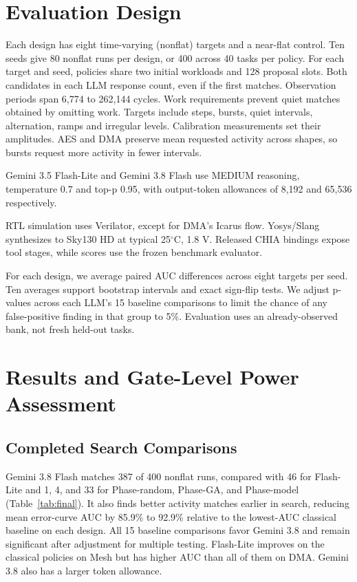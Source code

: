 \documentclass[conference]{IEEEtran}
\begin{document}
\section{Evaluation Design}
Each design has eight time-varying (nonflat) targets and a near-flat control.
Ten seeds give 80 nonflat runs per design, or 400 across 40 tasks per policy.
For each target and seed, policies share two initial workloads and 128 proposal
slots. Both candidates in each LLM response count, even if the first matches.
Observation periods span 6,774 to 262,144 cycles. Work requirements prevent
quiet matches obtained by omitting work.
Targets include steps, bursts, quiet intervals, alternation, ramps and irregular
levels. Calibration measurements set their amplitudes. AES and DMA preserve
mean requested activity across shapes, so bursts request more activity in fewer
intervals.

Gemini 3.5 Flash-Lite and Gemini 3.8 Flash use MEDIUM reasoning, temperature
0.7 and top-p 0.95, with output-token allowances of 8,192 and 65,536 respectively.

RTL simulation uses Verilator, except for DMA's Icarus flow. Yosys/Slang
synthesizes to Sky130 HD at typical 25$^\circ$C, 1.8 V. Released CHIA bindings
expose tool stages, while scores use the frozen benchmark evaluator.

For each design, we average paired AUC differences across eight targets per
seed. Ten averages support bootstrap intervals and exact sign-flip tests.
We adjust p-values across each LLM's 15 baseline comparisons to limit
the chance of any false-positive finding in that group to 5\%.
Evaluation uses an already-observed bank, not fresh held-out tasks.


\section{Results and Gate-Level Power Assessment}
\label{sec:results}
\subsection{Completed Search Comparisons}
Gemini 3.8 Flash matches 387 of 400 nonflat runs, compared with 46 for
Flash-Lite and 1, 4, and 33 for Phase-random, Phase-GA, and Phase-model
(Table~\ref{tab:final}). It also finds better activity matches earlier in
search, reducing mean error-curve AUC by 85.9\% to 92.9\% relative to the
lowest-AUC classical baseline on each design. All 15 baseline comparisons
favor Gemini 3.8 and remain significant after adjustment for multiple testing.
Flash-Lite improves on the classical policies on Mesh but has higher AUC than
all of them on DMA. Gemini 3.8 also has a larger token allowance.
\end{document}
